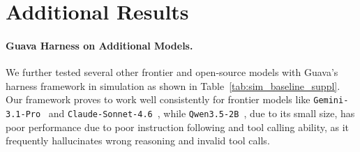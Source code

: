 \documentclass{llmxive}
\begin{document}
\section{Additional Results}

\paragraph{Guava Harness on Additional Models.}
We further tested several other frontier and open-source models with Guava's harness framework in simulation as shown in Table~\ref{tab:sim_baseline_suppl}. Our framework proves to work well consistently for frontier models like \texttt{Gemini-3.1-Pro}~\citep{fu2026capxframeworkbenchmarkingimproving} and \texttt{Claude-Sonnet-4.6}~\citep{qwen2026qwen35}, while \texttt{Qwen3.5-2B}~\citep{openai2026gpt54}, due to its small size, has poor performance due to poor instruction following and tool calling ability, as it frequently hallucinates wrong reasoning and invalid tool calls.
\end{document}
